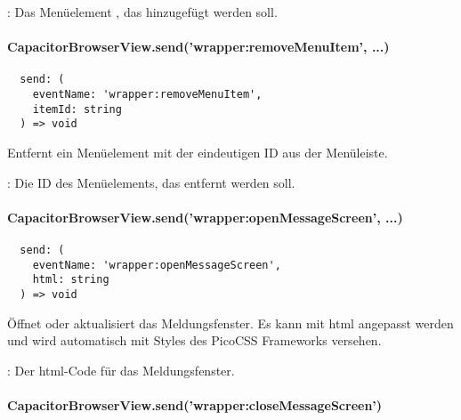 \begin{arguments}
  \item {}: Das Menüelement , das hinzugefügt werden soll.
\end{arguments}


\paragraph{CapacitorBrowserView.send('wrapper:removeMenuItem', ...)}

\begin{verbatim}
  send: (
    eventName: 'wrapper:removeMenuItem',
    itemId: string
  ) => void
\end{verbatim}

Entfernt ein Menüelement mit der eindeutigen ID  aus der Menüleiste.

\begin{arguments}
  \item {}: Die ID des Menüelements, das entfernt werden soll.
\end{arguments}


\paragraph{CapacitorBrowserView.send('wrapper:openMessageScreen', ...)}

\begin{verbatim}
  send: (
    eventName: 'wrapper:openMessageScreen',
    html: string
  ) => void
\end{verbatim}

Öffnet oder aktualisiert das Meldungsfenster.
Es kann mit \ac{html} angepasst werden und wird automatisch mit Styles des PicoCSS Frameworks versehen.

\begin{arguments}
  \item {}: Der \ac{html}-Code für das Meldungsfenster.
\end{arguments}


\newpage

\paragraph{CapacitorBrowserView.send('wrapper:closeMessageScreen')}


